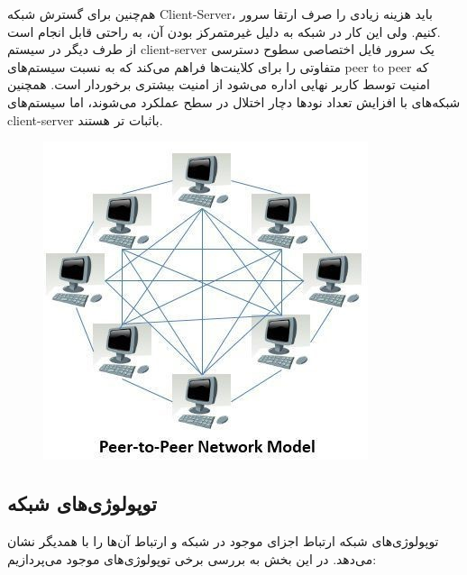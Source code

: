 \documentclass[]{article}
\begin{document}
\begin{itemize}
	هم‌چنین برای گسترش شبکه Client-Server، باید هزینه زیادی را صرف ارتقا سرور کنیم. ولی این کار در شبکه  به دلیل غیرمتمرکز بودن آن، به راحتی قابل انجام است.\\
	از طرف دیگر در سیستم client-server یک سرور فایل اختصاصی سطوح دسترسی متفاوتی را برای کلاینت‌ها فراهم می‌کند که به نسبت سیستم‌های peer to peer که امنیت توسط کاربر نهایی اداره می‌شود از امنیت بیشتری برخوردار است. همچنین شبکه‌های  با افزایش تعداد نودها دچار اختلال در سطح عملکرد می‌شوند، اما سیستم‌های client-server باثبات تر هستند.
	\begin{figure}[H]
		\centerline{\includegraphics[scale=0.8]{resources/p2p.jpg}}
	\end{figure}
\end{itemize}

\subsection*{{\titr توپولوژی‌های شبکه}}
توپولوژی‌های شبکه ارتباط اجزای موجود در شبکه و ارتباط آن‌ها را با همدیگر نشان می‌دهد. در این بخش به بررسی برخی توپولوژی‌های موجود می‌پردازیم:
\end{document}
